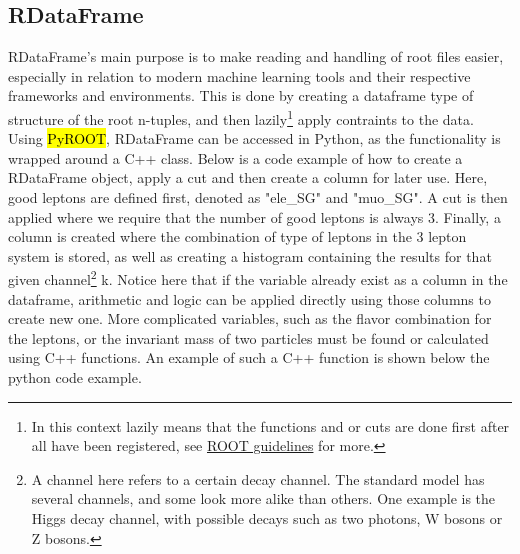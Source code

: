 \subsection*{RDataFrame}
RDataFrame's main purpose is to make reading and handling of root files easier, especially in relation to modern machine learning tools and their 
respective frameworks and environments. This is done by creating a dataframe type of structure of the root n-tuples, and then 
lazily\footnote{In this context lazily means that the functions and or cuts are done first after all have been registered, see \href{https://root.cern/doc/master/classROOT_1_1RDataFrame.html}{ROOT guidelines} for more.} 
apply contraints to the data. Using \hl{PyROOT}, RDataFrame can be accessed in Python, as the functionality is wrapped around a C++ class. Below is a code example of how
to create a RDataFrame object, apply a cut and then create a column for later use. Here, good leptons are defined first, denoted as "ele\_SG" and "muo\_SG". 
A cut is then applied where we require that the number of good leptons is always 3. Finally, a column is created where the combination of type of leptons 
in the 3 lepton system is stored, as well as creating a histogram containing the results for that given channel\footnote{A channel here refers to a certain decay channel. The standard model has several channels, and some look more alike than others. One example is the Higgs decay channel, with possible decays such as two photons, W bosons or Z bosons. } 
k. Notice here that if the variable already exist as a column in the dataframe, arithmetic and logic can be applied directly using those 
columns to create new one. More complicated variables, such as the flavor combination for the leptons, or the invariant mass of two particles must be 
found or calculated using C++ functions. An example of such a C++ function is shown below the python code example. 

